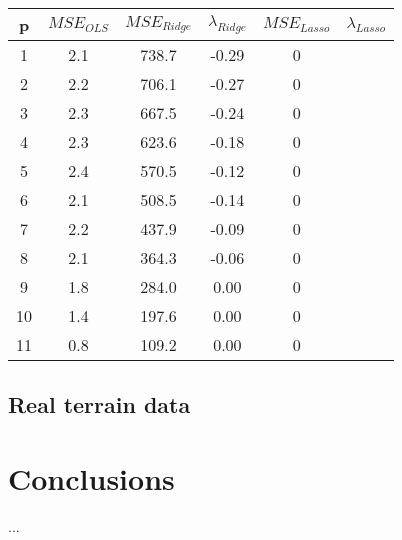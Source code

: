 \documentclass{emulateapj}
\begin{document}
\begin{table}[H]
\centering
\begin{tabular}{| c | c | c | c | c | c |}
  \hline 
  \textbf{p} & \textbf{$MSE_{OLS}$} & \textbf{$MSE_{Ridge}$}  & \textbf{$\lambda_{Ridge}$} & \textbf{$MSE_{Lasso}$} & \textbf{$\lambda_{Lasso}$} \\ \hline
   1 & 2.1   & 738.7  & -0.29  &  0 &  \\ \hline
   2 & 2.2   & 706.1  & -0.27  &  0 & \\ \hline
   3 & 2.3   & 667.5  & -0.24  &  0 &  \\ \hline
   4 & 2.3   & 623.6  & -0.18  &  0 &   \\ \hline
   5 & 2.4   & 570.5  & -0.12  &  0 &  \\ \hline
   6 & 2.1   & 508.5  & -0.14  &  0 &  \\ \hline
   7 & 2.2   & 437.9  & -0.09  &  0 &  \\ \hline
   8 & 2.1   & 364.3  & -0.06  &  0 &   \\ \hline
   9 & 1.8   & 284.0  & 0.00   &  0 &     \\ \hline
   10 & 1.4  & 197.6  & 0.00  &  0 &  \\ \hline
   11 & 0.8  & 109.2  & 0.00  &  0 &   \\
  \hline
\end{tabular} 
\caption{}
\label{tab:MSE_lambda_results}
\end{table}

\subsection{Real terrain data}


\section{Conclusions}
\label{sec:conclusions}

...




\end{document}
